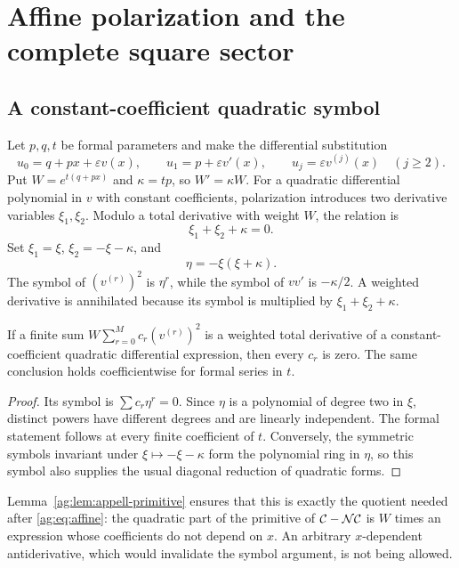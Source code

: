 \section{Affine polarization and the complete square sector}
\label{ag:sec:polarization}

\subsection{A constant-coefficient quadratic symbol}
Let $p,q,t$ be formal parameters and make the differential substitution
\begin{equation}\label{ag:eq:affine}
 u_0=q+px+\varepsilon v(x),\qquad
 u_1=p+\varepsilon v'(x),\qquad
 u_j=\varepsilon v^{(j)}(x)\quad(j\ge2).
\end{equation}
Put $W=e^{t(q+px)}$ and $\kappa=tp$, so $W'=\kappa W$.
For a quadratic differential polynomial in $v$ with constant
coefficients, polarization introduces two derivative variables
$\xi_1,\xi_2$. Modulo a total derivative with weight $W$, the relation is
\[
 \xi_1+\xi_2+\kappa=0.
\]
Set $\xi_1=\xi$, $\xi_2=-\xi-\kappa$, and
\begin{equation}\label{ag:eq:eta}
 \eta=-\xi(\xi+\kappa).
\end{equation}
The symbol of $(v^{(r)})^2$ is $\eta^r$, while the symbol of $vv'$ is
$-\kappa/2$. A weighted derivative is annihilated because its symbol is
multiplied by $\xi_1+\xi_2+\kappa$.

\begin{lemma}\label{ag:lem:symbol}
If a finite sum $W\sum_{r=0}^M c_r(v^{(r)})^2$ is a weighted total
derivative of a constant-coefficient quadratic differential expression,
then every $c_r$ is zero. The same conclusion holds coefficientwise for
formal series in $t$.
\end{lemma}
\begin{proof}
Its symbol is $\sum c_r\eta^r=0$. Since $\eta$ is a polynomial of
degree two in $\xi$, distinct powers have different degrees and are
linearly independent. The formal statement follows at every finite
coefficient of $t$. Conversely, the symmetric symbols invariant under
$\xi\mapsto-\xi-\kappa$ form the polynomial ring in $\eta$, so this
symbol also supplies the usual diagonal reduction of quadratic forms.
\end{proof}

Lemma~\ref{ag:lem:appell-primitive} ensures that this is exactly the
quotient needed after \eqref{ag:eq:affine}: the quadratic part of the
primitive of $\mathcal C-\mathcal N\mathcal C$ is $W$ times an expression
whose coefficients do not depend on $x$. An arbitrary $x$-dependent
antiderivative, which would invalidate the symbol argument, is not
being allowed.

